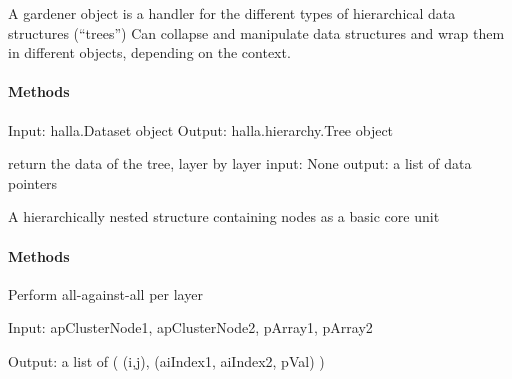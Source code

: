 \documentclass[letterpaper,10pt,english]{sphinxmanual}
\begin{document}
\begin{fulllineitems}
\label{index:halla.hierarchy.Gardener}
A gardener object is a handler for the different types of hierarchical data structures (``trees'')
Can collapse and manipulate data structures and wrap them in different objects, depending on the 
context.
\paragraph{Methods}

\begin{fulllineitems}
\label{index:halla.hierarchy.Gardener.PlantTree}
Input: halla.Dataset object 
Output: halla.hierarchy.Tree object

\end{fulllineitems}


\begin{fulllineitems}
\label{index:halla.hierarchy.Gardener.next}
return the data of the tree, layer by layer
input: None 
output: a list of data pointers

\end{fulllineitems}


\end{fulllineitems}


\begin{fulllineitems}
\label{index:halla.hierarchy.Tree}
A hierarchically nested structure containing nodes as
a basic core unit
\paragraph{Methods}

\end{fulllineitems}


\begin{fulllineitems}
\label{index:halla.hierarchy.all_against_all}
Perform all-against-all per layer

Input: apClusterNode1, apClusterNode2, pArray1, pArray2

Output: a list of ( (i,j), (aiIndex1, aiIndex2, pVal) )

\end{fulllineitems}
\end{document}
